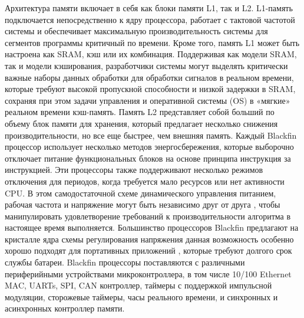Архитектура памяти включает в себя как блоки памяти L1, так и L2. L1-память подключается непосредственно к ядру процессора, работает с тактовой частотой системы и обеспечивает максимальную производительность системы для сегментов программы критичный по времени. Кроме того, память L1 может быть настроена как SRAM, кэш или их комбинация. 
Поддерживая как модели SRAM, так и модели кэширования, разработчики системы могут выделять критически важные наборы данных обработки для обработки сигналов в реальном времени, которые требуют высокой пропускной способности и низкой задержки в SRAM, сохраняя при этом задачи управления и оперативной системы (OS) в «мягкие» реальном времени кэш-память. Память L2 представляет собой больший по объему блок памяти для хранения, который предлагает несколько снижения производительности, но все еще быстрее, чем внешняя память. 
Каждый Blackfin процессор использует несколько методов энергосбережения, которые выборочно отключает питание функциональных блоков на основе принципа инструкция за инструкцией. Эти процессоры также поддерживают несколько режимов отключения для периодов, когда требуется мало ресурсов или нет активности CPU. 
В этом самодостаточной схеме динамического управления питанием, рабочая частота и напряжение могут быть независимо друг от друга , чтобы манипулировать удовлетворение требований к производительности алгоритма в настоящее время выполняется. Большинство процессоров Blackfin предлагают на кристалле ядра схемы регулирования напряжения данная возможность особенно хорошо подходят для портативных приложений , которые требуют долгого срок службы батареи. 
Blackfin процессоры поставляются с различными периферийными устройствами микроконтроллера, в том числе 10/100 Ethernet MAC, UARTs, SPI, CAN контроллер, таймеры с поддержкой импульсной модуляции, сторожевые таймеры, часы реального времени, и синхронных и асинхронных контроллер памяти.
